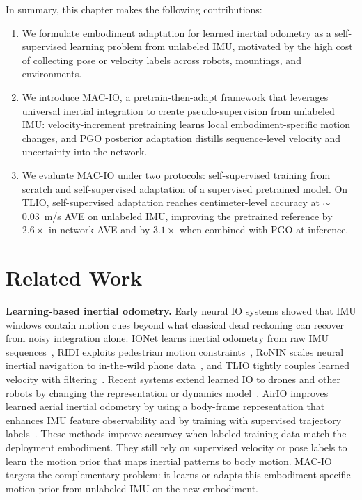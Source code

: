 In summary, this chapter makes the following contributions:
\begin{enumerate}
    \item We formulate embodiment adaptation for learned inertial odometry as a self-supervised learning problem from unlabeled IMU, motivated by the high cost of collecting pose or velocity labels across robots, mountings, and environments.
    \item We introduce MAC-IO, a pretrain-then-adapt framework that leverages universal inertial integration to create pseudo-supervision from unlabeled IMU: velocity-increment pretraining learns local embodiment-specific motion changes, and PGO posterior adaptation distills sequence-level velocity and uncertainty into the network.
    \item We evaluate MAC-IO under two protocols: self-supervised training from scratch and self-supervised adaptation of a supervised pretrained model. On TLIO, self-supervised adaptation reaches centimeter-level accuracy at $\sim$0.03~m/s AVE on unlabeled IMU, improving the pretrained reference by $2.6\times$ in network AVE and by $3.1\times$ when combined with PGO at inference.
\end{enumerate}

\section{Related Work}
\label{sec:macio:relatedwork}

\textbf{Learning-based inertial odometry.}
Early neural IO systems showed that IMU windows contain motion cues beyond what classical dead reckoning can recover from noisy integration alone.
IONet learns inertial odometry from raw IMU sequences~\cite{chen2018ionet}, RIDI exploits pedestrian motion constraints~\cite{yan2018ridi}, RoNIN scales neural inertial navigation to in-the-wild phone data~\cite{herath2020ronin}, and TLIO tightly couples learned velocity with filtering~\cite{liu2020tlio}.
Recent systems extend learned IO to drones and other robots by changing the representation or dynamics model~\cite{cioffi2023learned, qiu2025airio}.
AirIO improves learned aerial inertial odometry by using a body-frame representation that enhances IMU feature observability and by training with supervised trajectory labels~\cite{qiu2025airio}.
These methods improve accuracy when labeled training data match the deployment embodiment.
They still rely on supervised velocity or pose labels to learn the motion prior that maps inertial patterns to body motion.
MAC-IO targets the complementary problem: it learns or adapts this embodiment-specific motion prior from unlabeled IMU on the new embodiment.

